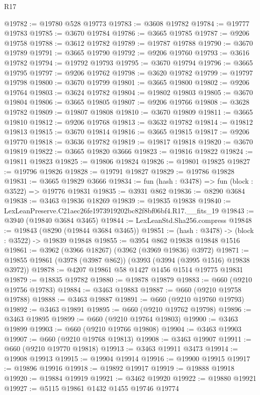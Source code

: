 \begin{lexlean}{R17}
\begin{coremodule}
@19782 := @19780 @528 @19773
@19783 := @3608 @19782
@19784 := @19777 @19783
@19785 := @3670 @19784
@19786 := @3665 @19785
@19787 := @9206 @19758
@19788 := @3612 @19782
@19789 := @19787 @19788
@19790 := @3670 @19789
@19791 := @3665 @19790
@19792 := @9206 @19760
@19793 := @3616 @19782
@19794 := @19792 @19793
@19795 := @3670 @19794
@19796 := @3665 @19795
@19797 := @9206 @19762
@19798 := @3620 @19782
@19799 := @19797 @19798
@19800 := @3670 @19799
@19801 := @3665 @19800
@19802 := @9206 @19764
@19803 := @3624 @19782
@19804 := @19802 @19803
@19805 := @3670 @19804
@19806 := @3665 @19805
@19807 := @9206 @19766
@19808 := @3628 @19782
@19809 := @19807 @19808
@19810 := @3670 @19809
@19811 := @3665 @19810
@19812 := @9206 @19768
@19813 := @3632 @19782
@19814 := @19812 @19813
@19815 := @3670 @19814
@19816 := @3665 @19815
@19817 := @9206 @19770
@19818 := @3636 @19782
@19819 := @19817 @19818
@19820 := @3670 @19819
@19822 := @3665 @19820 @3666
@19823 := @19816 @19822
@19824 := @19811 @19823
@19825 := @19806 @19824
@19826 := @19801 @19825
@19827 := @19796 @19826
@19828 := @19791 @19827
@19829 := @19786 @19828
@19831 := @3665 @19829 @3666
@19834 := fun (hash : @3478) => fun (block : @3522) => @19776 @19831
@19835 := @3931 @862
@19836 := @8290 @3684
@19838 := @3463 @19836 @18269
@19839 := @19835 @19838
@19840 := LexLeanPreserve.C21aec26fe1973919202bc82f8bf06bf4.R17.__fits_19
@19843 := @3940 (@19840 @3684 @3465)
@19844 := LexLeanStd.Sha256.compress
@19848 := @19843 (@8290 (@19844 @3684 @3465))
@19851 := (hash : @3478) -> (block : @3522) -> @19839 @19848
@19855 := @3954 @862 @19838 @19848 @1516
@19861 := @3962 (@3966 @18267) (@3962 (@3969 @19836) @3972)
@19871 := @19855 @19861 (@3978 (@3987 @862)) (@3993 (@3994 (@3995 @1516) @19838 @3972))
@19878 := @4207 @19861 @58 @1427 @1456 @1514 @19775 @19831
@19879 := @18835 @19782
@19880 := @19878 @19879
@19883 := @660 (@9210 @19756 @19783)
@19884 := @3463 @19883
@19887 := @660 (@9210 @19758 @19788)
@19888 := @3463 @19887
@19891 := @660 (@9210 @19760 @19793)
@19892 := @3463 @19891
@19895 := @660 (@9210 @19762 @19798)
@19896 := @3463 @19895
@19899 := @660 (@9210 @19764 @19803)
@19900 := @3463 @19899
@19903 := @660 (@9210 @19766 @19808)
@19904 := @3463 @19903
@19907 := @660 (@9210 @19768 @19813)
@19908 := @3463 @19907
@19911 := @660 (@9210 @19770 @19818)
@19913 := @3463 @19911 @3473
@19914 := @19908 @19913
@19915 := @19904 @19914
@19916 := @19900 @19915
@19917 := @19896 @19916
@19918 := @19892 @19917
@19919 := @19888 @19918
@19920 := @19884 @19919
@19921 := @3462 @19920
@19922 := @19880 @19921
@19927 := @5115 @19861 @1432 @1455 @19746 @19774

\end{coremodule}
\end{lexlean}
